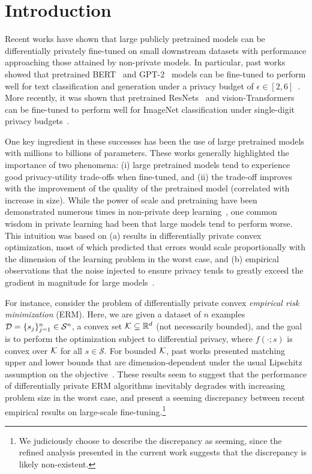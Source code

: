 \section{Introduction}

Recent works have shown that large publicly pretrained models can be differentially privately fine-tuned on small downstream datasets with performance approaching those attained by non-private models. 
In particular, past works showed that pretrained BERT~\citep{devlin2018bert} and GPT-2~\citep{radford2018improving,radford2019language} models can be fine-tuned to perform well for text classification and generation under a privacy budget of $\epsilon \in [2, 6]$~\citep{li2021large,yu2021differentially}. 
More recently, it was shown that pretrained ResNets~\citep{he2016deep} and vision-Transformers~\citep{dosovitskiy2020image} can be fine-tuned to perform well for ImageNet classification under single-digit privacy budgets~\citep{de2022unlocking,mehta2022large}. 

One key ingredient in these successes has been the use of large pretrained models with millions to billions of parameters. 
These works generally highlighted the importance of two phenomena: (i) large pretrained models tend to experience good privacy-utility trade-offs when fine-tuned, and (ii) the trade-off improves with the improvement of the quality of the pretrained model (correlated with increase in size).
While the power of scale and pretraining have been demonstrated numerous times in non-private deep learning~\citep{kaplan2020scaling}, one common wisdom in private learning had been that large models tend to perform worse.
This intuition was based on (a) results in differentially private convex optimization, most of which predicted that errors would scale proportionally with the dimension of the learning problem in the worst case, and (b) empirical observations that the noise injected to ensure privacy tends to greatly exceed the gradient in magnitude for large models~\citep{yu2021not,gautum14}. 

For instance, consider the problem of differentially private convex \emph{empirical risk minimization} (ERM).
Here, we are given a dataset of $n$ examples $\mathcal D = \{s_j\}_{j=1}^n \in \mathcal{S}^{n}$, a convex set $\mathcal K \subseteq \mathbb{R}^{d}$ (not necessarily bounded), and the goal is to perform the optimization
subject to differential privacy, 
where $f(\cdot;s)$ is convex over $\mathcal K$ for all $s\in \mathcal{S}$. 
For bounded $\mathcal K$, past works presented matching upper and lower bounds that are dimension-dependent under the usual Lipschitz assumption on the objective~\citep{bassily2014private,chaudhuri2011differentially}.
These results seem to suggest that the performance of differentially private ERM algorithms inevitably degrades with increasing problem size in the worst case, and present a seeming discrepancy between recent empirical results on large-scale fine-tuning.\footnote{We judiciously choose to describe the discrepancy as seeming, since the refined analysis presented in the current work suggests that the discrepancy is likely non-existent.}

